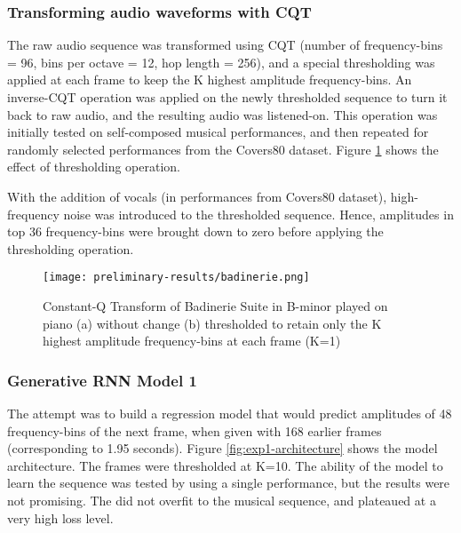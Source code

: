 \documentclass[../main.tex]{subfiles}
\begin{document}
\subsubsection{Transforming audio waveforms with CQT}

\par
The raw audio sequence was transformed using \gls{CQT} (number of frequency-bins = 96, bins per octave = 12, hop length = 256), and a special thresholding was applied at each frame to keep the K highest amplitude frequency-bins. An inverse-\gls{CQT} operation was applied on the newly thresholded sequence to turn it back to raw audio, and the resulting audio was listened-on. This operation was initially tested on self-composed musical performances, and then repeated for randomly selected performances from the Covers80 dataset. Figure \ref{fig:badinerie} shows the effect of thresholding operation.

\par
With the addition of vocals (in performances from Covers80 dataset), high-frequency noise was introduced to the thresholded sequence. Hence, amplitudes in top 36 frequency-bins were brought down to zero before applying the thresholding operation.

\begin{figure}[H]
    \centering
    \texttt{[image: preliminary-results/badinerie.png]}
    \caption{Constant-Q Transform of Badinerie Suite in B-minor played on piano (a) without change (b) thresholded to retain only the K highest amplitude frequency-bins at each frame (K=1) }
    \label{fig:badinerie}
\end{figure}

\iffalse
\begin{figure}[H]
    \centering
    \texttt{[image: preliminary-results/c-major-scale.png]}
    \caption{Constant-Q Transform of ascending and descending the C-major scale, thresholded to retain only the highest K amplitude frequency-bins at each frame (K=1 here) }
    \label{fig:c-major-scale}
\end{figure}
\fi



\subsubsection{Generative RNN Model 1}

\par
The attempt was to build a regression model that would predict amplitudes of 48 frequency-bins of the next frame, when given with 168 earlier frames (corresponding to 1.95 seconds). Figure \ref{fig:exp1-architecture} shows the model architecture. The frames were thresholded at K=10. The ability of the model to learn the sequence was tested by using a single performance, but the results were not promising. The did not overfit to the musical sequence, and plateaued at a very high loss level.
\end{document}
